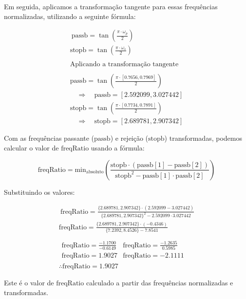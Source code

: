 Em seguida, aplicamos a transformação tangente para essas frequências normalizadas, utilizando a seguinte fórmula:

\begin{align*} \
    \text{passb} = \tan\left(\frac{\pi \cdot \omega_p}{2}\right)         \\
    \text{stopb} = \tan\left(\frac{\pi \cdot \omega_s}{2}\right)         \\
    \\
    \text{Aplicando a transformação tangente}                            \\
    \\
    \text{passb} = \tan\left(\frac{\pi \cdot [0.7656, 0.7969]}{2}\right) \\ \quad \Rightarrow \quad \text{passb} = [2.592099, 3.027442] \\
    \text{stopb} = \tan\left(\frac{\pi \cdot [0.7734, 0.7891]}{2}\right) \\ \quad \Rightarrow \quad \text{stopb} = [2.689781, 2.907342]
\end{align*}


Com as frequências passante ($\text{passb}$) e rejeição ($\text{stopb}$) transformadas, podemos calcular o valor de $\text{freqRatio}$ usando a fórmula:

$$
    \text{freqRatio} = \text{min}_{\text{absoluto}} \left(\frac{\text{stopb} \cdot (\text{passb}[1] - \text{passb}[2])}{\text{stopb}^2 - \text{passb}[1] \cdot \text{passb}[2]} \right)
$$

Substituindo os valores:

\begin{align*} \
    \text{freqRatio} = \frac{\{2.689781, 2.907342\} \cdot (2.592099 - 3.027442)}{\{2.689781, 2.907342\}^2 - 2.592099 \cdot 3.027442} \\
    \text{freqRatio} = \frac{\{2.689781, 2.907342\} \cdot (-0.4346)}{\{7.2392, 8.4526\} - 7.8541}                      \\
    \\
    \begin{array}{cc}
\text{freqRatio} = \frac{-1.1700}{-0.6149} & \text{freqRatio} = \frac{-1.2635}{0.5985} \\
\text{freqRatio} = 1.9027                  & \text{freqRatio} = -2.1111
\end{array}
\\
\therefore \text{freqRatio} = 1.9027
\end{align*}

Este é o valor de $\text{freqRatio}$ calculado a partir das frequências normalizadas e transformadas.


